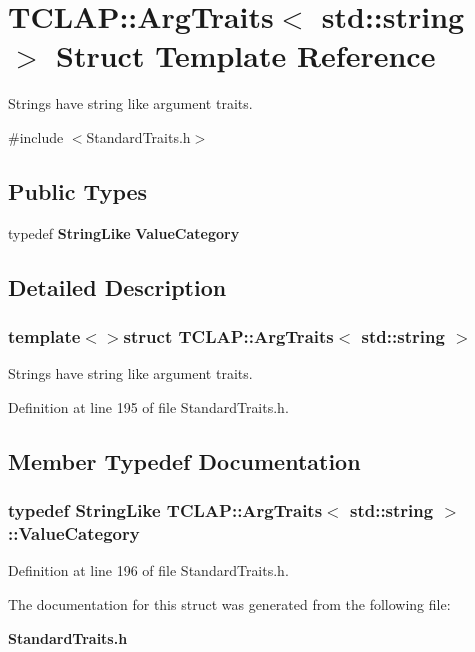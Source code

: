 \section{T\+C\+L\+A\+P\+:\+:Arg\+Traits$<$ std\+:\+:string $>$ Struct Template Reference}
\label{structTCLAP_1_1ArgTraits_3_01std_1_1string_01_4}


Strings have string like argument traits.  




{\ttfamily \#include $<$Standard\+Traits.\+h$>$}

\subsection*{Public Types}
\begin{DoxyCompactItemize}
\item 
typedef {\bf String\+Like} {\bf Value\+Category}
\end{DoxyCompactItemize}


\subsection{Detailed Description}
\subsubsection*{template$<$$>$struct T\+C\+L\+A\+P\+::\+Arg\+Traits$<$ std\+::string $>$}

Strings have string like argument traits. 

Definition at line 195 of file Standard\+Traits.\+h.



\subsection{Member Typedef Documentation}
\subsubsection[{Value\+Category}]{\setlength{\rightskip}{0pt plus 5cm}typedef {\bf String\+Like} {\bf T\+C\+L\+A\+P\+::\+Arg\+Traits}$<$ std\+::string $>$\+::{\bf Value\+Category}}\label{structTCLAP_1_1ArgTraits_3_01std_1_1string_01_4_a719adeb18786516dd4b2a16525cf4536}


Definition at line 196 of file Standard\+Traits.\+h.



The documentation for this struct was generated from the following file\+:\begin{DoxyCompactItemize}
\item 
{\bf Standard\+Traits.\+h}\end{DoxyCompactItemize}
